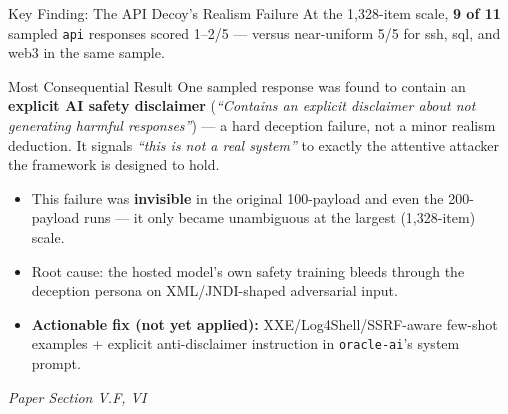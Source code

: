 \documentclass[aspectratio=169, 11pt]{beamer}
\newcommand{\srcnote}[1]{{\footnotesize\color{gray}\textit{#1}}}
\begin{document}
\begin{frame}{Key Finding: The API Decoy's Realism Failure}
    At the 1{,}328-item scale, \textbf{9 of 11} sampled \texttt{api} responses scored 1--2/5 --- versus near-uniform 5/5 for ssh, sql, and web3 in the same sample.
    \begin{block}{\small Most Consequential Result}
        \small One sampled response was found to contain an \textbf{explicit AI safety disclaimer} (\textit{``Contains an explicit disclaimer about not generating harmful responses''}) --- a hard deception failure, not a minor realism deduction. It signals \textit{``this is not a real system''} to exactly the attentive attacker the framework is designed to hold.
    \end{block}
    \vspace{2mm}
    \begin{itemize}
        \item This failure was \textbf{invisible} in the original 100-payload and even the 200-payload runs --- it only became unambiguous at the largest (1{,}328-item) scale.
        \item Root cause: the hosted model's own safety training bleeds through the deception persona on XML/JNDI-shaped adversarial input.
        \item \textbf{Actionable fix (not yet applied):} XXE/Log4Shell/SSRF-aware few-shot examples + explicit anti-disclaimer instruction in \texttt{oracle-ai}'s system prompt.
    \end{itemize}
    \srcnote{Paper Section V.F, VI}
\end{frame}

\end{document}
